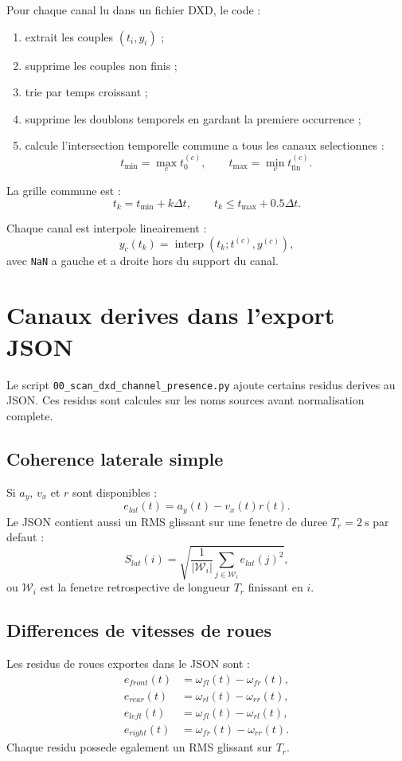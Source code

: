 \documentclass[11pt,a4paper]{article}
\begin{document}
Pour chaque canal lu dans un fichier DXD, le code :

\begin{enumerate}[label=\arabic*.]
  \item extrait les couples $(t_i,y_i)$ ;
  \item supprime les couples non finis ;
  \item trie par temps croissant ;
  \item supprime les doublons temporels en gardant la premiere occurrence ;
  \item calcule l'intersection temporelle commune a tous les canaux selectionnes :
  \[
    t_{\min}=\max_c t^{(c)}_0,\qquad
    t_{\max}=\min_c t^{(c)}_{\mathrm{fin}}.
  \]
\end{enumerate}

La grille commune est :
\[
  t_k = t_{\min}+k\Delta t,\qquad t_k \le t_{\max}+0.5\Delta t.
\]

Chaque canal est interpole lineairement :
\[
  y_c(t_k)=\operatorname{interp}(t_k; t^{(c)}, y^{(c)}),
\]
avec \texttt{NaN} a gauche et a droite hors du support du canal.

\section{Canaux derives dans l'export JSON}

Le script \texttt{00\_scan\_dxd\_channel\_presence.py} ajoute certains residus derives au JSON.
Ces residus sont calcules sur les noms sources avant normalisation complete.

\subsection{Coherence laterale simple}

Si $a_y$, $v_x$ et $r$ sont disponibles :
\[
  e_{lat}(t)=a_y(t)-v_x(t)r(t).
\]
Le JSON contient aussi un RMS glissant sur une fenetre de duree $T_r=2~\mathrm{s}$ par defaut :
\[
  S_{lat}(i)=
  \sqrt{
    \frac{1}{|\mathcal{W}_i|}
    \sum_{j\in\mathcal{W}_i} e_{lat}(j)^2
  },
\]
ou $\mathcal{W}_i$ est la fenetre retrospective de longueur $T_r$ finissant en $i$.

\subsection{Differences de vitesses de roues}

Les residus de roues exportes dans le JSON sont :
\[
\begin{aligned}
  e_{front}(t) &= \omega_{fl}(t)-\omega_{fr}(t),\\
  e_{rear}(t)  &= \omega_{rl}(t)-\omega_{rr}(t),\\
  e_{left}(t)  &= \omega_{fl}(t)-\omega_{rl}(t),\\
  e_{right}(t) &= \omega_{fr}(t)-\omega_{rr}(t).
\end{aligned}
\]
Chaque residu possede egalement un RMS glissant sur $T_r$.
\end{document}
